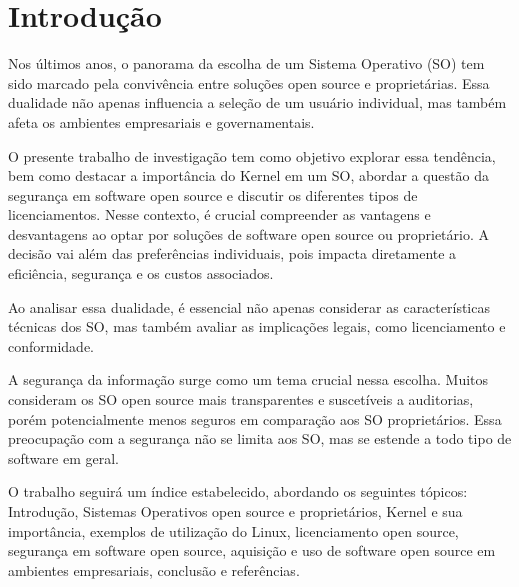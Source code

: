 \section{Introdução} \label{section: Introducao}
Nos últimos anos, o panorama da escolha de um Sistema Operativo (SO) tem sido marcado pela convivência entre soluções open source e proprietárias. Essa dualidade não apenas influencia a seleção de um usuário individual, mas também afeta os ambientes empresariais e governamentais.

O presente trabalho de investigação tem como objetivo explorar essa tendência, bem como destacar a importância do Kernel em um SO, abordar a questão da segurança em software open source e discutir os diferentes tipos de licenciamentos. Nesse contexto, é crucial compreender as vantagens e desvantagens ao optar por soluções de software open source ou proprietário. A decisão vai além das preferências individuais, pois impacta diretamente a eficiência, segurança e os custos associados.

Ao analisar essa dualidade, é essencial não apenas considerar as características técnicas dos SO, mas também avaliar as implicações legais, como licenciamento e conformidade.

A segurança da informação surge como um tema crucial nessa escolha. Muitos consideram os SO open source mais transparentes e suscetíveis a auditorias, porém potencialmente menos seguros em comparação aos SO proprietários. Essa preocupação com a segurança não se limita aos SO, mas se estende a todo tipo de software em geral.

O trabalho seguirá um índice estabelecido, abordando os seguintes tópicos: Introdução, Sistemas Operativos open source e proprietários, Kernel e sua importância, exemplos de utilização do Linux, licenciamento open source, segurança em software open source, aquisição e uso de software open source em ambientes empresariais, conclusão e referências.

\vspace{2cm}

